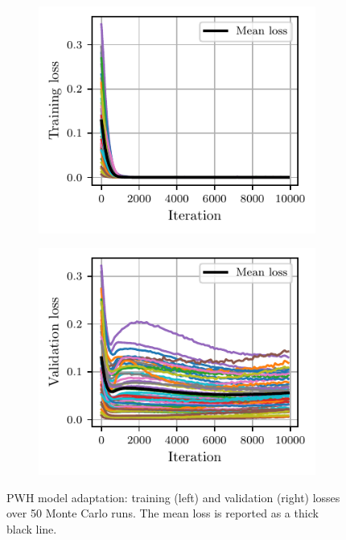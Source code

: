\documentclass{ifacconf}
\begin{document}
\begin{figure}[t]
\begin{subfigure}{0.49\linewidth}
\includegraphics[width=\linewidth]{img/adaptation/pwh_train_loss_new.pdf}
\label{fig:PWH_model_adaptation_train_loss}   
\end{subfigure}
\hfill
\begin{subfigure}{0.49\linewidth}
\includegraphics[width=\linewidth]{img/adaptation/pwh_val_loss_new.pdf}
\label{fig:PWH_model_adaptation_val_loss}
\end{subfigure}
\caption{PWH model adaptation: training (left) and validation (right) losses over 50 Monte Carlo runs. The mean loss  
is reported as a thick black line.}
\label{fig:PWH_model_adaptation_loss}
\end{figure}
\end{document}
